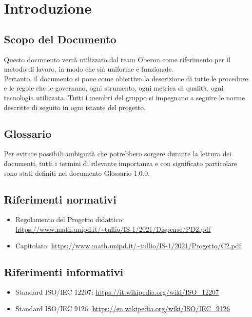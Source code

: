 \section{Introduzione}
\subsection{Scopo del Documento}
Questo documento verrà utilizzato dal team Oberon come riferimento per il metodo di lavoro, in modo che sia uniforme e funzionale.\\Pertanto, il documento si pone come obiettivo la descrizione di tutte le procedure e le regole che le governano, ogni strumento, ogni metrica di qualità, ogni tecnologia utilizzata. Tutti i membri del gruppo si impegnano a seguire le norme descritte di seguito in ogni istante del progetto. 



\subsection{Glossario}
Per evitare possibili ambiguità che potrebbero sorgere durante la lettura dei documenti, tutti i termini di rilevante importanza e con significato particolare sono stati definiti nel documento Glossario 1.0.0.

\subsection{Riferimenti normativi}
\begin{itemize}
    \item Regolamento del Progetto didattico:\\ \url{https://www.math.unipd.it/~tullio/IS-1/2021/Dispense/PD2.pdf}
    \item Capitolato: \url{https://www.math.unipd.it/~tullio/IS-1/2021/Progetto/C2.pdf}
\end{itemize}
\subsection{Riferimenti informativi}
\begin{itemize}
    \item Standard ISO/IEC 12207: \url{https://it.wikipedia.org/wiki/ISO_12207}
    \item Standard ISO/IEC 9126: \url{https://en.wikipedia.org/wiki/ISO/IEC_9126}
\end{itemize}








